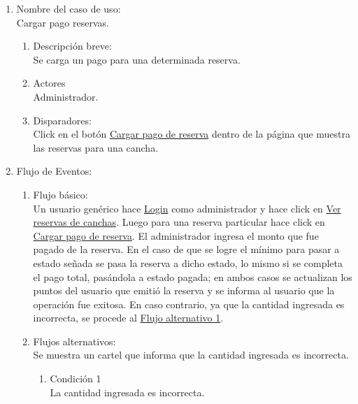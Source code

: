 \documentclass[a4paper,11pt]{article}
\begin{document}
\begin{enumerate}

    \item Nombre del caso de uso: \\
    Cargar pago reservas.

    \begin{enumerate}
    \item Descripción breve: \\
        Se carga un pago para una determinada reserva.
    \item Actores \\
        Administrador.
    \item Disparadores: \\
        Click en el botón \underline{Cargar pago de reserva} dentro de la
        página que muestra las reservas para una cancha.
    \end{enumerate}

    \item Flujo de Eventos: \\

    \begin{enumerate}

        \item Flujo básico:\\
            Un usuario genérico hace \underline{Login} como administrador y
            hace click en \underline{Ver reservas de canchas}. Luego para una
            reserva particular hace click en
            \underline{Cargar pago de reserva}. El administrador ingresa el
            monto que fue pagado de la reserva. En el caso de que se logre el
            mínimo para pasar a estado señada se pasa la reserva a dicho
            estado, lo mismo si se completa el pago total, pasándola a estado
            pagada; en ambos casos se actualizan los puntos del usuario que
            emitió la reserva y se informa al usuario que la operación fue
            exitosa. En caso contrario, ya que la cantidad ingresada es
            incorrecta, se procede al \underline{Flujo alternativo 1}. 


        \item Flujos alternativos:\\
            Se muestra un cartel que informa que la cantidad ingresada es
            incorrecta.
            \begin{enumerate}
                \item Condición 1 \\
                    La cantidad ingresada es incorrecta.
            \end{enumerate}


\end{enumerate}
\end{enumerate}
\end{document}
